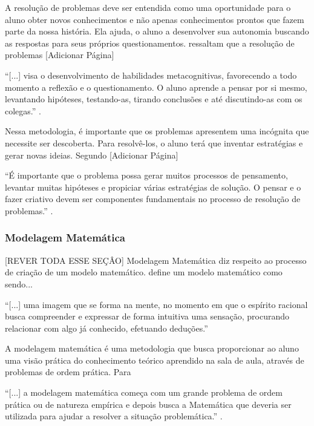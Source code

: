A resolução de problemas deve ser entendida como uma oportunidade para o aluno obter novos conhecimentos e não apenas conhecimentos prontos que fazem parte da nossa história. Ela ajuda, o aluno a 
desenvolver sua autonomia buscando as respostas para seus próprios questionamentos.  ressaltam  que a resolução de problemas 
[Adicionar P\'agina]
\begin{citacao}
``[...] visa o desenvolvimento de habilidades metacognitivas, favorecendo a todo momento a reflexão e o questionamento. O aluno aprende a pensar por si mesmo, levantando hipóteses, testando-as, 
tirando conclusões e até discutindo-as com os colegas.'' \cite{fossa1998tendencias}. 
\end{citacao}

Nessa metodologia, é importante que os problemas apresentem uma incógnita que necessite ser descoberta. Para resolvê-los, o aluno terá que inventar estrat\'egias e gerar novas ideias. Segundo 
[Adicionar P\'agina]
\begin{citacao}
``É importante que o problema possa gerar muitos processos de pensamento, levantar muitas hipóteses e propiciar várias estratégias de solução. O pensar e o fazer criativo devem ser componentes fundamentais no processo de resolução de problemas.'' \cite{dante1991didatica}.
\end{citacao}

\subsubsection{Modelagem Matemática}
[REVER TODA ESSE SE\c{C}\^AO]
Modelagem Matemática diz respeito ao processo de criação de um modelo matemático.  define um modelo matemático como sendo...
\begin{citacao}
``[...] uma imagem que se forma na mente, no momento em que o espírito racional busca compreender e expressar de forma intuitiva uma sensação, procurando relacionar com algo já conhecido, efetuando deduções.''
\end{citacao}

A modelagem matemática é uma metodologia que busca proporcionar ao aluno uma visão prática do conhecimento teórico aprendido na sala de aula, através de problemas de ordem prática. Para 
\begin{citacao}
``[...] a modelagem matemática começa com um grande problema de ordem prática ou de natureza empírica e depois busca a Matemática que deveria ser utilizada para ajudar a resolver a situação problemática.'' \cite[p.~15]{fossa1998tendencias}.
\end{citacao}

